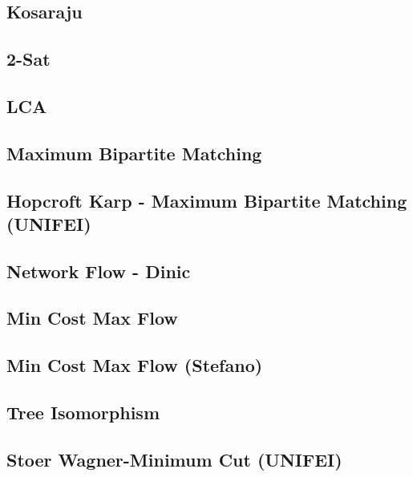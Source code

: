 \subsection{Kosaraju}
\raggedbottom
\hrulefill
\subsection{2-Sat}
\raggedbottom
\hrulefill
\subsection{LCA}
\raggedbottom
\hrulefill
\subsection{Maximum Bipartite Matching}
\raggedbottom
\hrulefill
\subsection{Hopcroft Karp - Maximum Bipartite Matching (UNIFEI)}
\raggedbottom
\hrulefill
\subsection{Network Flow - Dinic}
\raggedbottom
\hrulefill
\subsection{Min Cost Max Flow}
\raggedbottom
\hrulefill
\subsection{Min Cost Max Flow (Stefano)}
\raggedbottom
\hrulefill
\subsection{Tree Isomorphism}
\raggedbottom
\hrulefill
\subsection{Stoer Wagner-Minimum Cut (UNIFEI)}
\raggedbottom
\hrulefill
